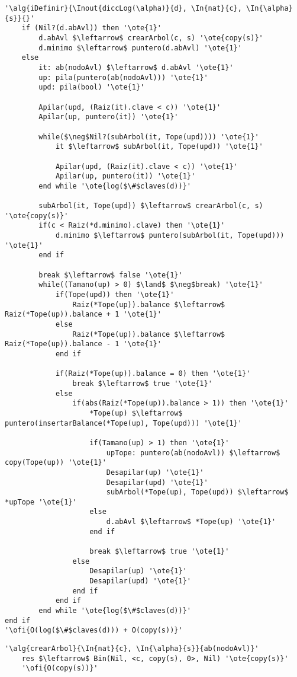 \pagebreak
\begin{lstlisting}[mathescape]
'\alg{iDefinir}{\Inout{diccLog(\alpha)}{d}, \In{nat}{c}, \In{\alpha}{s}}{}'
	if (Nil?(d.abAvl)) then '\ote{1}'
		d.abAvl $\leftarrow$ crearArbol(c, s) '\ote{copy(s)}'
		d.minimo $\leftarrow$ puntero(d.abAvl) '\ote{1}'
	else
		it: ab(nodoAvl) $\leftarrow$ d.abAvl '\ote{1}'
		up: pila(puntero(ab(nodoAvl))) '\ote{1}'
		upd: pila(bool) '\ote{1}'

		Apilar(upd, (Raiz(it).clave < c)) '\ote{1}'
		Apilar(up, puntero(it)) '\ote{1}'

		while($\neg$Nil?(subArbol(it, Tope(upd)))) '\ote{1}'
			it $\leftarrow$ subArbol(it, Tope(upd)) '\ote{1}'

			Apilar(upd, (Raiz(it).clave < c)) '\ote{1}'
			Apilar(up, puntero(it)) '\ote{1}'
		end while '\ote{log($\#$claves(d))}'

		subArbol(it, Tope(upd)) $\leftarrow$ crearArbol(c, s) '\ote{copy(s)}'
		if(c < Raiz(*d.minimo).clave) then '\ote{1}'
			d.minimo $\leftarrow$ puntero(subArbol(it, Tope(upd))) '\ote{1}'
		end if

		break $\leftarrow$ false '\ote{1}'
		while((Tamano(up) > 0) $\land$ $\neg$break) '\ote{1}'
			if(Tope(upd)) then '\ote{1}'
				Raiz(*Tope(up)).balance $\leftarrow$ Raiz(*Tope(up)).balance + 1 '\ote{1}'
			else
				Raiz(*Tope(up)).balance $\leftarrow$ Raiz(*Tope(up)).balance - 1 '\ote{1}'
			end if

			if(Raiz(*Tope(up)).balance = 0) then '\ote{1}'
				break $\leftarrow$ true '\ote{1}'
			else
				if(abs(Raiz(*Tope(up)).balance > 1)) then '\ote{1}'
					*Tope(up) $\leftarrow$ puntero(insertarBalance(*Tope(up), Tope(upd))) '\ote{1}'

					if(Tamano(up) > 1) then '\ote{1}'
						upTope: puntero(ab(nodoAvl)) $\leftarrow$ copy(Tope(up)) '\ote{1}'
						Desapilar(up) '\ote{1}'
						Desapilar(upd) '\ote{1}'
						subArbol(*Tope(up), Tope(upd)) $\leftarrow$ *upTope '\ote{1}'
					else
						d.abAvl $\leftarrow$ *Tope(up) '\ote{1}'
					end if

					break $\leftarrow$ true '\ote{1}'
				else
					Desapilar(up) '\ote{1}'
					Desapilar(upd) '\ote{1}'
				end if
			end if
		end while '\ote{log($\#$claves(d))}'
end if
'\ofi{O(log($\#$claves(d))) + O(copy(s))}'
\end{lstlisting}

\begin{lstlisting}[mathescape]
'\alg{crearArbol}{\In{nat}{c}, \In{\alpha}{s}}{ab(nodoAvl)}'
	res $\leftarrow$ Bin(Nil, <c, copy(s), 0>, Nil) '\ote{copy(s)}'
	'\ofi{O(copy(s))}'
\end{lstlisting}

